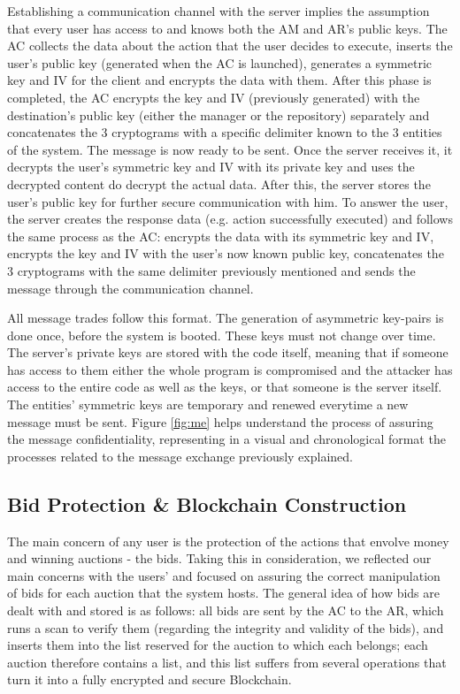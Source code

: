 \documentclass[a4paper]{article}
\begin{document}
Establishing a communication channel with the server implies the assumption that every user has access to and knows both the AM and AR's public keys.
The AC collects the data about the action that the user decides to execute, inserts the user's public key (generated when the AC is launched), generates a symmetric key and IV for the client and encrypts the data with them.
After this phase is completed, the AC encrypts the key and IV (previously generated) with the destination's public key (either the manager or the repository) separately and concatenates the 3 cryptograms with a specific delimiter known to the 3 entities of the system.
\newline The message is now ready to be sent.
Once the server receives it, it decrypts the user's symmetric key and IV with its private key and uses the decrypted content do decrypt the actual data.
After this, the server stores the user's public key for further secure communication with him.
To answer the user, the server creates the response data (e.g. action successfully executed) and follows the same process as the AC: encrypts the data with its symmetric key and IV, encrypts the key and IV with the user's now known public key, concatenates the 3 cryptograms with the same delimiter previously mentioned and sends the message through the communication channel.

All message trades follow this format.
The generation of asymmetric key-pairs is done once, before the system is booted. These keys must not change over time.
The server's private keys are stored with the code itself, meaning that if someone has access to them either the whole program is compromised and the attacker has access to the entire code as well as the keys, or that someone is the server itself.
The entities' symmetric keys are temporary and renewed everytime a new message must be sent.
Figure \ref{fig:me} helps understand the process of assuring the message confidentiality, representing in a visual and chronological format the processes related to the message exchange previously explained.

\subsection{Bid Protection \& Blockchain Construction}

The main concern of any user is the protection of the actions that envolve money and winning auctions - the bids.
Taking this in consideration, we reflected our main concerns with the users' and focused on assuring the correct manipulation of bids for each auction that the system hosts.
The general idea of how bids are dealt with and stored is as follows: all bids are sent by the AC to the AR, which runs a scan to verify them (regarding the integrity and validity of the bids), and inserts them into the list reserved for the auction to which each belongs; each auction therefore contains a list, and this list suffers from several operations that turn it into a fully encrypted and secure Blockchain.
\end{document}
